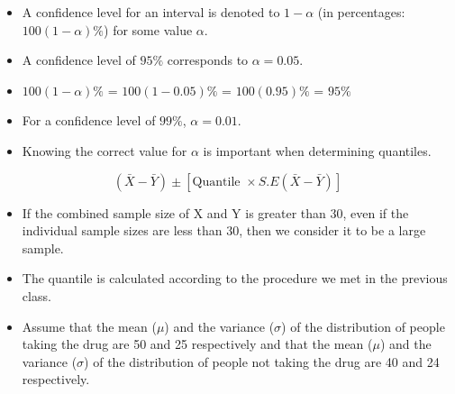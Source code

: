 \documentclass[]{report}
\begin{document}
\begin{itemize}
\item A confidence level for an interval is denoted to $1-\alpha$ (in percentages: $100(1-\alpha)\%$) for some value $\alpha$.
\item A confidence level of $95\%$ corresponds to $\alpha = 0.05$.
\item $100(1-\alpha)\%$ = $100(1-0.05)\%$  = $100(0.95)\%$ = $95\%$
\item For a confidence level of $99\%$, $\alpha = 0.01$.
\item Knowing the correct value for $\alpha$ is important when determining quantiles.
\end{itemize}















\[ ( \bar{X} - \bar{Y} ) \pm \left[ \mbox{Quantile } \times S.E(\bar{X}-\bar{Y}) \right] \]
\begin{itemize}
	\item If the combined sample size of X and Y is greater than 30, even if the individual sample sizes are less than 30, then we consider it to be a large sample.
	\item The quantile is calculated according to the procedure we met in the previous class.
\end{itemize}

\begin{itemize}
	\item Assume that the mean ($\mu$) and the variance ($\sigma$) of the distribution 
	of people taking the drug are 50 and 25 respectively and that the mean ($\mu$) 
	and the variance ($\sigma$) of the distribution of people not taking the drug are 
	40 and 24 respectively. 
\end{itemize}
\end{document}

